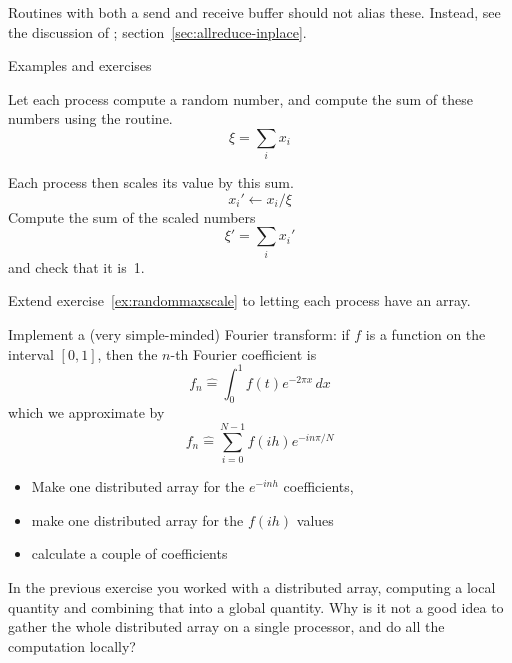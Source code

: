 \begin{remark}
  Routines with both a send and receive buffer should not alias these.
  Instead, see the discussion of ;
  section~\ref{sec:allreduce-inplace}.
\end{remark}

 {Examples and exercises}

\begin{exercise}
  \label{ex:randommaxscale}
  Let each process compute a random number,
  and compute the sum of these numbers using the 
  routine.
  \[ \xi = \sum_i x_i \]

  Each process then scales its value
  by this sum.
  \[ x_i' \leftarrow x_i/ \xi \]
  Compute the sum of the scaled numbers
  \[ \xi' = \sum_i x_i' \]
  and check that it is~1.
\end{exercise}

\begin{exercise}
  \label{ex:randommaxarray}
  Extend exercise~\ref{ex:randommaxscale} to letting each process have an array.
\end{exercise}

\begin{exercise}
  \label{ex:fft-vector}
  Implement a (very simple-minded) Fourier transform: if $f$ is a
  function on the interval $[0,1]$, then the $n$-th Fourier
  coefficient is
  \[ f_n\hat = \int_0^1 f(t)e^{-2\pi x}\,dx \]
  which we approximate by
  \[ f_n\hat = \sum_{i=0}^{N-1} f(ih)e^{-in\pi/N} \]
  \begin{itemize}
  \item Make one distributed array for the $e^{-inh}$ coefficients,
  \item make one distributed array for the $f(ih)$ values
  \item calculate a couple of coefficients
  \end{itemize}
\end{exercise}

\begin{exercise}
  In the previous exercise you worked with a distributed array,
  computing a local quantity and combining that into a global
  quantity.
  Why is it not a good idea to gather the whole distributed array on a
  single processor, and do all the computation locally?
\end{exercise}


